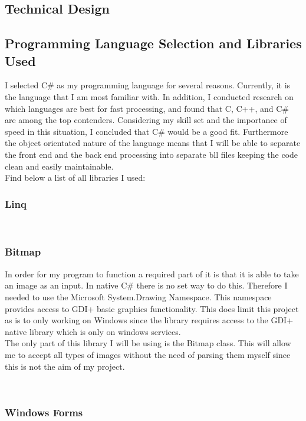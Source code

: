 \begin{flushleft}
    \large
    \section{Technical Design}

    \subsection{Programming Language Selection and Libraries Used}

    I selected C# as my programming language for several reasons. Currently, it is the language that I am most familiar with. In addition, I conducted research on which languages are best for fast processing, and found that C, C++, and C# are among the top contenders. Considering my skill set and the importance of speed in this situation, I concluded that C# would be a good fit. Furthermore the object orientated nature of the language means that I will be able to separate the front end and the back end processing into separate bll files keeping the code clean and easily maintainable.\\ 
    \bk
    Find below a list of all libraries I used: \\
    \subsubsection*{Linq}
    
    
    \\ \bk



    \subsubsection*{Bitmap}
    In order for my program to function a required part of it is that it is able to take an image as an input. In native C# there is no set way to do this. Therefore I needed to use the Microsoft System.Drawing Namespace. This namespace provides access to GDI+ basic graphics functionality. This does limit this project as is to only working on Windows since the library requires access to the GDI+ native library which is only on windows services. \\ The only part of this library I will be using is the Bitmap class. This will allow me to accept all types of images without the need of parsing them myself since this is not the aim of my project. 

    \\ \bk

    \subsubsection*{Windows Forms}
    


    \\ \bk



\end{flushleft}